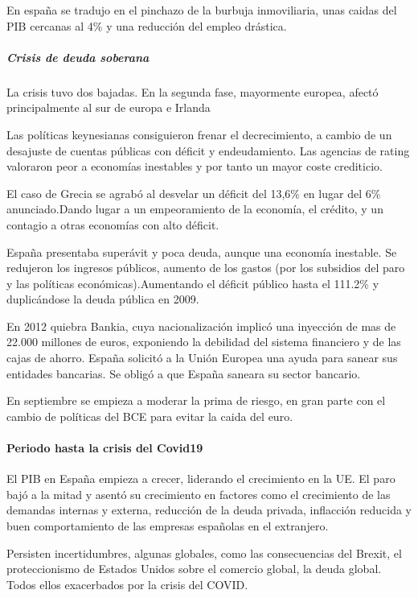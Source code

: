                 En españa se tradujo en el pinchazo de la burbuja inmoviliaria, unas caidas del PIB cercanas al 4\% y una reducción del empleo drástica.

            \subparagraph{Crisis de deuda soberana}  %
                La crisis tuvo dos bajadas. En la segunda fase, mayormente europea, afectó principalmente al sur de europa e Irlanda

                Las políticas keynesianas consiguieron frenar el decrecimiento, a cambio de un desajuste de cuentas públicas con déficit y endeudamiento. Las agencias de rating valoraron peor a economías inestables y por tanto un mayor coste crediticio.

                El caso de Grecia se agrabó al desvelar un déficit del 13,6\% en lugar del 6\% anunciado.Dando lugar a un empeoramiento de la economía, el crédito, y un contagio a otras economías con alto déficit.

                España presentaba superávit y poca deuda, aunque una economía inestable. Se redujeron los ingresos públicos, aumento de los gastos (por los subsidios del paro y las políticas económicas).Aumentando el déficit público hasta el 111.2\% y duplicándose la deuda pública en 2009.

                En 2012 quiebra Bankia, cuya nacionalización implicó una inyección de mas de 22.000 millones de euros, exponiendo la debilidad del sistema financiero y de las cajas de ahorro. España solicitó a la Unión Europea una ayuda para sanear sus entidades bancarias. Se obligó a que España saneara su sector bancario.

                En septiembre se empieza a moderar la prima de riesgo, en gran parte con el cambio de políticas del BCE para evitar la caida del euro.

        \paragraph{Periodo hasta la crisis del Covid19} %
            El PIB en España empieza a crecer, liderando el crecimiento en la UE. El paro bajó a la mitad y asentó su crecimiento en factores como el crecimiento de las demandas internas y externa, reducción de la deuda privada, inflacción reducida y buen comportamiento de las empresas españolas en el extranjero.

            Persisten incertidumbres, algunas globales, como las consecuencias del Brexit, el proteccionismo de Estados Unidos sobre el comercio global, la deuda global. Todos ellos exacerbados por la crisis del COVID.

